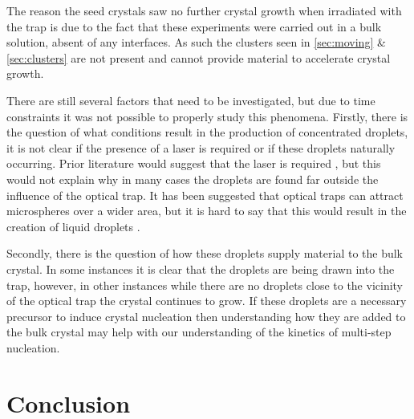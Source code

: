 The reason the seed crystals saw no further crystal growth when irradiated 
with the trap is due to the fact that these experiments were carried out 
in a bulk solution, absent of any interfaces. As such the clusters seen in
\ref{sec:moving} \& \ref{sec:clusters} are not present and cannot provide
material to accelerate crystal growth.

There are still several factors that need to be investigated, but due to time
constraints it was not possible to properly study this phenomena. Firstly, 
there is the question of what conditions result in the production of concentrated
droplets, it is not clear if the presence of a laser is required or if these
droplets naturally occurring. Prior literature would suggest that the laser is 
required \cite{Liao2022, Tsuboi2009}, but this would not explain why in many 
cases the droplets are found far outside the influence of the optical trap. It
has been suggested that optical traps can attract microspheres over a wider 
area, but it is hard to say that this would result in the creation of liquid 
droplets \cite{Yi2021}.

Secondly, there is the question of how these droplets supply material to the 
bulk crystal. In some instances it is clear that the droplets are being drawn 
into the trap, however, in other instances while there are no droplets close to
the vicinity of the optical trap the crystal continues to grow. If these droplets
are a necessary precursor to induce crystal nucleation then understanding how
they are added to the bulk crystal may help with our understanding of the kinetics
of multi-step nucleation. 

\section{Conclusion}

